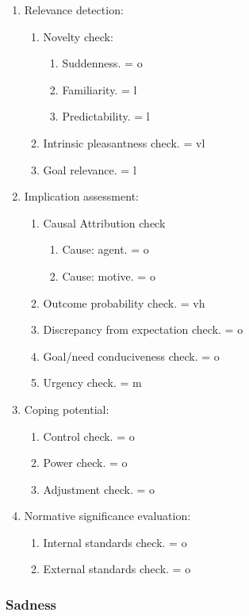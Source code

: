 \begin{enumerate}
 \item  Relevance detection:
 \begin{enumerate}
  \item  Novelty check:
  \begin{enumerate}
   \item  Suddenness. = o
   \item  Familiarity. = l
   \item  Predictability. = l
  \end{enumerate}
  \item  Intrinsic pleasantness check. = vl
  \item  Goal relevance. = l
 \end{enumerate}
 \item  Implication assessment:
 \begin{enumerate}
  \item  Causal Attribution check
  \begin{enumerate}
   \item  Cause: agent. = o
   \item  Cause: motive. = o
  \end{enumerate}
  \item  Outcome probability check. = vh
  \item  Discrepancy from expectation check. = o
  \item  Goal/need conduciveness check. = o
  \item  Urgency check. = m
 \end{enumerate}
 \item  Coping potential:
 \begin{enumerate}
  \item  Control check. = o
  \item  Power check. = o
  \item  Adjustment check. = o
 \end{enumerate}
 \item  Normative significance evaluation:
 \begin{enumerate}
  \item  Internal standards check. = o
  \item  External standards check. = o
 \end{enumerate}
\end{enumerate}


\subsubsection{Sadness}

